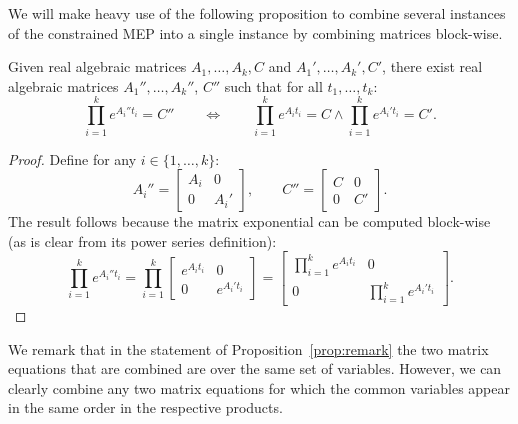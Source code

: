 

We will make heavy use of the following proposition to combine several
instances of the constrained MEP into a single instance by combining
matrices block-wise.
\begin{proposition}\label{prop:remark}
  Given real algebraic matrices $A_1,\ldots,A_k,C$ and
  $A_1',\ldots,A_k',C'$, there exist real algebraic matrices
  $A_1'',\ldots,A_k''$, $C''$ such that for all $t_1,\ldots,t_k$:
\[\prod_{i=1}^ke^{A_i''t_i}=C''\qquad\Leftrightarrow\qquad\prod_{i=1}^ke^{A_it_i}=C\wedge\prod_{i=1}^ke^{A_i't_i}=C'.\]
\label{prop:combine}
\end{proposition}

\begin{proof}
Define for any $i\in\{1,\ldots,k\}$:
\[A_i''=\begin{bmatrix}A_i&0\\0&A_i'\end{bmatrix},\qquad
C''=\begin{bmatrix}C&0\\0&C'\end{bmatrix}.\]
The result follows because the matrix exponential can be computed
block-wise (as is clear from its power series definition):
\[\prod_{i=1}^ke^{A_i''t_i}=\prod_{i=1}^k\begin{bmatrix}e^{A_it_i}&0\\0&e^{A_i't_i}\end{bmatrix}=
\begin{bmatrix}\prod_{i=1}^ke^{A_it_i}&0\\0&\prod_{i=1}^ke^{A_i't_i}\end{bmatrix}.\]
\end{proof}

We remark that in the statement of Proposition~\ref{prop:remark} the
two matrix equations that are combined are over the same set of
variables.  However, we can clearly combine any two matrix equations
for which the common variables appear in the same order in the
respective products.

